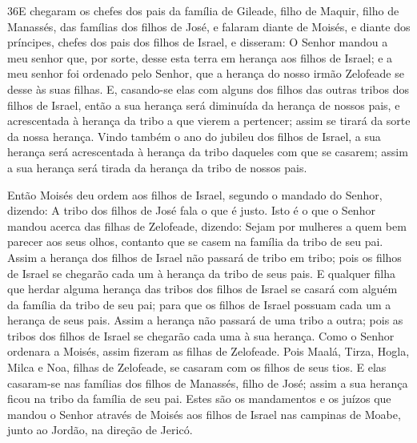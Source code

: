 \medskip

\lettrine{36} E chegaram os chefes dos pais da família de
Gileade, filho de Maquir, filho de Manassés, das famílias dos filhos
de José, e falaram diante de Moisés, e diante dos príncipes, chefes
dos pais dos filhos de Israel, e disseram: O Senhor mandou a meu
senhor que, por sorte, desse esta terra em herança aos filhos de
Israel; e a meu senhor foi ordenado pelo Senhor, que a herança do
nosso irmão Zelofeade se desse às suas filhas. E, casando-se
elas com alguns dos filhos das outras tribos dos filhos de Israel,
então a sua herança será diminuída da herança de nossos pais, e
acrescentada à herança da tribo a que vierem a pertencer; assim se
tirará da sorte da nossa herança. Vindo também o ano do jubileu
dos filhos de Israel, a sua herança será acrescentada à herança da
tribo daqueles com que se casarem; assim a sua herança será tirada
da herança da tribo de nossos pais.

Então Moisés deu ordem aos filhos de Israel, segundo o mandado do
Senhor, dizendo: A tribo dos filhos de José fala o que é justo.
Isto é o que o Senhor mandou acerca das filhas de Zelofeade,
dizendo: Sejam por mulheres a quem bem parecer aos seus olhos,
contanto que se casem na família da tribo de seu pai. Assim a
herança dos filhos de Israel não passará de tribo em tribo; pois os
filhos de Israel se chegarão cada um à herança da tribo de seus
pais. E qualquer filha que herdar alguma herança das tribos dos
filhos de Israel se casará com alguém da família da tribo de seu
pai; para que os filhos de Israel possuam cada um a herança de seus
pais. Assim a herança não passará de uma tribo a outra; pois as
tribos dos filhos de Israel se chegarão cada uma à sua herança.
Como o Senhor ordenara a Moisés, assim fizeram as filhas de
Zelofeade. Pois Maalá, Tirza, Hogla, Milca e Noa, filhas de
Zelofeade, se casaram com os filhos de seus tios. E elas
casaram-se nas famílias dos filhos de Manassés, filho de José; assim
a sua herança ficou na tribo da família de seu pai. Estes são
os mandamentos e os juízos que mandou o Senhor através de Moisés aos
filhos de Israel nas campinas de Moabe, junto ao Jordão, na direção
de Jericó.

